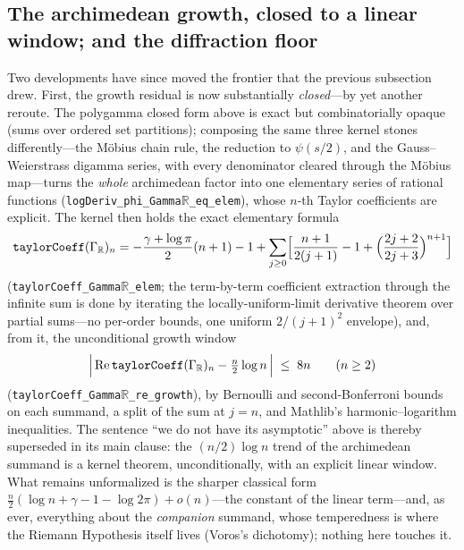 \subsection{The archimedean growth, closed to a linear window; and the diffraction floor}

Two developments have since moved the frontier that the previous subsection drew.
First, the growth residual is now substantially \emph{closed}---by yet another
reroute. The polygamma closed form above is exact but combinatorially opaque
(sums over ordered set partitions); composing the same three kernel stones
differently---the M\"obius chain rule, the reduction to $\psi(s/2)$, and the
Gauss--Weierstrass digamma series, with every denominator cleared through the
M\"obius map---turns the \emph{whole} archimedean factor into one elementary
series of rational functions (\texttt{logDeriv\_phi\_Gamma}\(\mathbb{R}\)\texttt{\_eq\_elem}),
whose $n$-th Taylor coefficients are explicit. The kernel then holds the exact
elementary formula
\[
  \texttt{taylorCoeff}(\Gamma_{\mathbb R})_n
    = -\frac{\gamma + \log\pi}{2}(n+1) - 1
      + \sum_{j\ge 0}\Bigl[\frac{n+1}{2(j+1)} - 1
        + \Bigl(\frac{2j+2}{2j+3}\Bigr)^{n+1}\Bigr]
\]
(\texttt{taylorCoeff\_Gamma}\(\mathbb{R}\)\texttt{\_elem}; the term-by-term coefficient
extraction through the infinite sum is done by iterating the locally-uniform-limit
derivative theorem over partial sums---no per-order bounds, one uniform
$2/(j+1)^2$ envelope), and, from it, the unconditional growth window
\[
  \Bigl|\,\mathrm{Re}\,\texttt{taylorCoeff}(\Gamma_{\mathbb R})_n
    - \tfrac{n}{2}\log n\,\Bigr| \;\le\; 8n \qquad (n \ge 2)
\]
(\texttt{taylorCoeff\_Gamma}\(\mathbb{R}\)\texttt{\_re\_growth}), by Bernoulli and
second-Bonferroni bounds on each summand, a split of the sum at $j = n$, and
Mathlib's harmonic--logarithm inequalities. The sentence ``we do not have its
asymptotic'' above is thereby superseded in its main clause: the $(n/2)\log n$
trend of the archimedean summand is a kernel theorem, unconditionally, with an
explicit linear window. What remains unformalized is the sharper classical form
$\tfrac{n}{2}(\log n + \gamma - 1 - \log 2\pi) + o(n)$---the constant of the
linear term---and, as ever, everything about the \emph{companion} summand, whose
temperedness is where the Riemann Hypothesis itself lives (Voros's dichotomy);
nothing here touches it.

